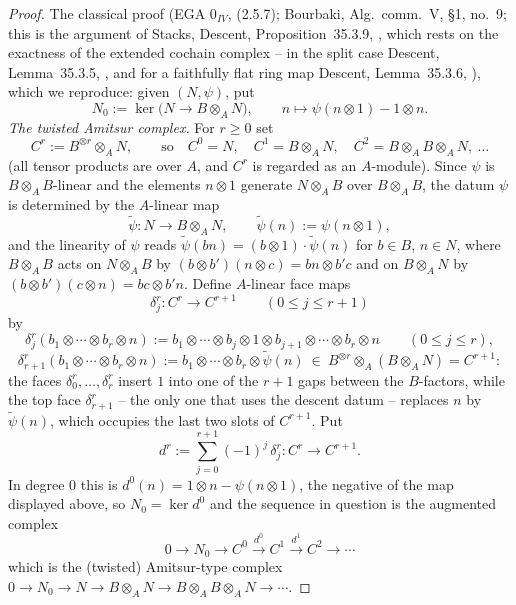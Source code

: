 \begin{proof}
The classical proof (EGA 0$_{IV}$, (2.5.7); Bourbaki, Alg.\ comm.\ V,
\S1, no.\ 9; this is the argument of Stacks, Descent,
Proposition~35.3.9, , which rests on the exactness
of the extended cochain complex -- in the split case Descent,
Lemma~35.3.5, , and for a faithfully flat ring map
Descent, Lemma~35.3.6, ),
which we reproduce:  given $(N,\psi)$, put
\[
N_0:=\ker\bigl(N\longrightarrow B\otimes_AN\bigr),
\qquad
n\longmapsto\psi(n\otimes1)-1\otimes n .
\]
\emph{The twisted Amitsur complex.}  For $r\ge0$ set
\[
C^r:=B^{\otimes r}\otimes_AN,
\qquad\text{so}\quad C^0=N,\quad C^1=B\otimes_AN,\quad
C^2=B\otimes_AB\otimes_AN,\ \dots
\]
(all tensor products are over $A$, and $C^r$ is regarded as an
$A$-module).  Since $\psi$ is $B\otimes_AB$-linear and the elements
$n\otimes1$ generate $N\otimes_AB$ over $B\otimes_AB$, the datum $\psi$
is determined by the $A$-linear map
\[
\widetilde\psi:N\longrightarrow B\otimes_AN,
\qquad \widetilde\psi(n):=\psi(n\otimes1),
\]
and the linearity of $\psi$ reads
$\widetilde\psi(bn)=(b\otimes1)\cdot\widetilde\psi(n)$ for $b\in B$,
$n\in N$, where $B\otimes_AB$ acts on $N\otimes_AB$ by
$(b\otimes b')(n\otimes c)=bn\otimes b'c$ and on $B\otimes_AN$ by
$(b\otimes b')(c\otimes n)=bc\otimes b'n$.  Define $A$-linear face maps
\[
\delta^r_j:C^r\longrightarrow C^{r+1}\qquad(0\le j\le r+1)
\]
by
\[
\delta^r_j(b_1\otimes\cdots\otimes b_r\otimes n):=
b_1\otimes\cdots\otimes b_j\otimes1\otimes b_{j+1}\otimes\cdots\otimes
b_r\otimes n\qquad(0\le j\le r),
\]
\[
\delta^r_{r+1}(b_1\otimes\cdots\otimes b_r\otimes n):=
b_1\otimes\cdots\otimes b_r\otimes\widetilde\psi(n)\ \in\
B^{\otimes r}\otimes_A(B\otimes_AN)=C^{r+1}:
\]
the faces $\delta^r_0,\dots,\delta^r_r$ insert $1$ into one of the $r+1$
gaps between the $B$-factors, while the top face $\delta^r_{r+1}$ -- the
only one that uses the descent datum -- replaces $n$ by
$\widetilde\psi(n)$, which occupies the last two slots of $C^{r+1}$.
Put
\[
d^r:=\sum_{j=0}^{r+1}(-1)^j\,\delta^r_j:C^r\longrightarrow C^{r+1}.
\]
In degree $0$ this is $d^0(n)=1\otimes n-\psi(n\otimes1)$, the negative
of the map displayed above, so $N_0=\ker d^0$ and the sequence in
question is the augmented complex
\[
0\to N_0\to C^0\xrightarrow{\ d^0\ }C^1\xrightarrow{\ d^1\ }
C^2\to\cdots
\]
which is the (twisted) Amitsur-type complex
$0\to N_0\to N\to B\otimes_AN\to B\otimes_AB\otimes_AN\to\cdots$.


\end{proof}
